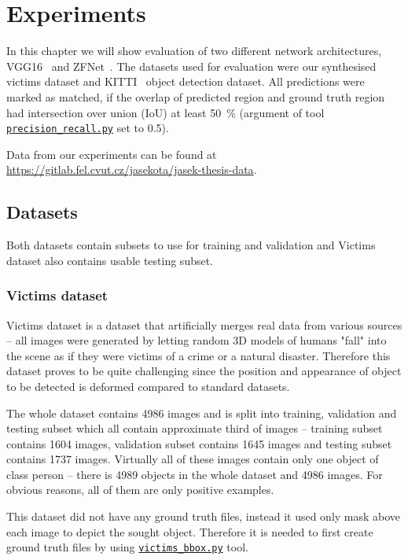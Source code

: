\chapter{Experiments}

In this chapter we will show evaluation of two different network architectures, VGG16~\cite{vgg16} and ZFNet~\cite{zfnet}. The datasets used for evaluation were our synthesised victims dataset and KITTI~\cite{kitti} object detection dataset. All predictions were marked as matched, if the overlap of predicted region and ground truth region had intersection over union (IoU) at least 50~\% (argument  of tool \hyperref[pr]{\texttt{precision\_recall.py}} set to 0.5).

Data from our experiments can be found at \url{https://gitlab.fel.cvut.cz/jasekota/jasek-thesis-data}.

\section{Datasets}
Both datasets contain subsets to use for training and validation and Victims dataset also contains usable testing subset.

\subsection{Victims dataset}
Victims dataset is a dataset that artificially merges real data from various sources -- all images were generated by letting random 3D models of humans "fall" into the scene as if they were victims of a crime or a natural disaster. Therefore this dataset proves to be quite challenging since the position and appearance of object to be detected is deformed compared to standard datasets.

The whole dataset contains 4986 images and is split into training, validation and testing subset which all contain approximate third of images -- training subset contains 1604 images, validation subset contains 1645 images and testing subset contains 1737 images. Virtually all of these images contain only one object of class person -- there is 4989 objects in the whole dataset and 4986 images. For obvious reasons, all of them are only positive examples.

This dataset did not have any ground truth files, instead it used only mask above each image to depict the sought object. Therefore it is needed to first create ground truth files by using \hyperref[bbox]{\texttt{victims\_bbox.py}} tool.

